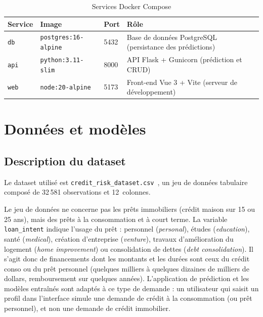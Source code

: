 \documentclass[12pt,a4paper,openany]{report}
\begin{document}
\begin{table}[H]
    \centering
    \caption{Services Docker Compose}
    \label{tab:docker-services}
    \begin{tabularx}{\textwidth}{l l l X}
        \toprule
        \textbf{Service} & \textbf{Image} & \textbf{Port} & \textbf{Rôle} \\
        \midrule
        \texttt{db}  & \texttt{postgres:16-alpine}  & 5432 & Base de données PostgreSQL (persistance des prédictions) \\
        \texttt{api} & \texttt{python:3.11-slim}     & 8000 & API Flask + Gunicorn (prédiction et CRUD) \\
        \texttt{web} & \texttt{node:20-alpine}       & 5173 & Front-end Vue 3 + Vite (serveur de développement) \\
        \bottomrule
    \end{tabularx}
\end{table}


\chapter{Données et modèles}

\section{Description du dataset}

Le dataset utilisé est \texttt{credit\_risk\_dataset.csv}~\cite{kaggle-credit-risk}, un jeu de données tabulaire composé de 32\,581 observations et 12~colonnes.

Le jeu de données ne concerne pas les prêts immobiliers (crédit maison sur 15 ou 25 ans), mais des prêts à la consommation et à court terme. La variable \texttt{loan\_intent} indique l'usage du prêt : personnel (\emph{personal}), études (\emph{education}), santé (\emph{medical}), création d'entreprise (\emph{venture}), travaux d'amélioration du logement (\emph{home improvement}) ou consolidation de dettes (\emph{debt consolidation}). Il s'agit donc de financements dont les montants et les durées sont ceux du crédit conso ou du prêt personnel (quelques milliers à quelques dizaines de milliers de dollars, remboursement sur quelques années). L'application de prédiction et les modèles entraînés sont adaptés à ce type de demande : un utilisateur qui saisit un profil dans l'interface simule une demande de crédit à la consommation (ou prêt personnel), et non une demande de crédit immobilier.
\end{document}
